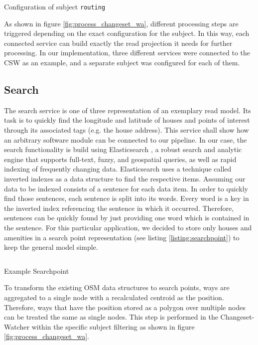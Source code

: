 \documentclass[conference]{IEEEtran}
\begin{document}
\begin{listing}[h]
    \inputminted{json}{listings/config-routing.json}
    \caption{Configuration of subject \texttt{routing}}
    \label{list:routing-configuration}
\end{listing}
As shown in figure \ref{fig:process_changeset_wa}, different processing steps are triggered depending on the exact configuration for the subject. In this way, each connected service can build exactly the read projection it needs for further processing. In our implementation, three different services were connected to the CSW as an example, and a separate subject was configured for each of them. 

\subsection{Search}
\label{subsec:Search}
The search service is one of three representation of an exemplary read model. Its task is to quickly find the longitude and latitude of houses and points of interest through its associated tags (e.g. the house address). This service shall show how an arbitrary software module can be connected to our pipeline.
In our case, the search functionality is build using Elasticsearch \cite{noauthor_elasticsearch_nodate}, a robust search and analytic engine that supports full-text, fuzzy, and geospatial queries, as well as rapid indexing of frequently changing data. Elasticsearch uses a technique called inverted indexes as a data structure to find the respective items. Assuming our data to be indexed consists of a sentence for each data item. In order to quickly find those sentences, each sentence is split into its words. Every word is a key in the inverted index referencing the sentence in which it occurred. Therefore, sentences can be quickly found by just providing one word which is contained in the sentence. \cite{noauthor_elasticsearch_2013}
For this particular application, we decided to store only houses and amenities in a search point representation (see listing \ref{listing:searchpoint}) to keep the general model simple. 

\begin{listing}[h]
    \inputminted{json}{listings/searchpoint.json}
    \caption{Example Searchpoint}
    \label{listing:searchpoint}
\end{listing}

To transform the existing OSM data structures to search points, ways are aggregated to a single node with a recalculated centroid as the position. 
Therefore, ways that have the position stored as a polygon over multiple nodes can be treated the same as single nodes. This step is performed in the Changeset-Watcher within the specific subject filtering as shown in figure \ref{fig:process_changeset_wa}. 
\end{document}
